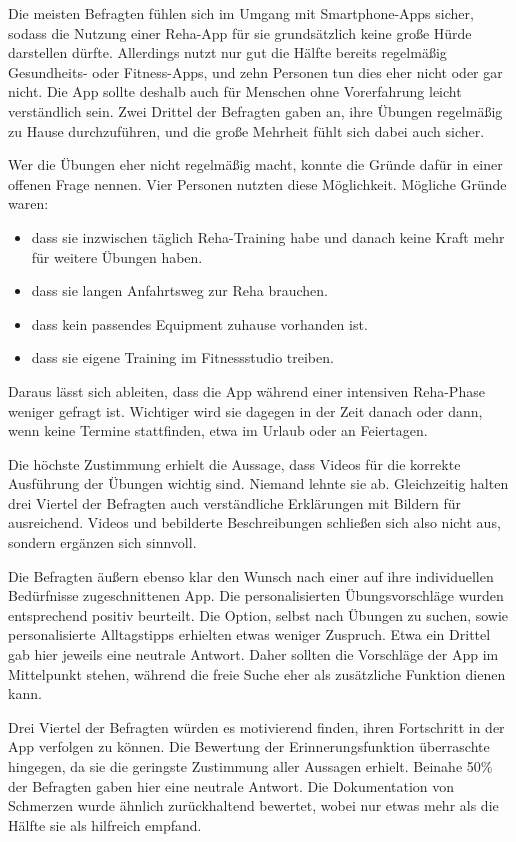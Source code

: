 Die meisten Befragten fühlen sich im Umgang mit Smartphone-Apps sicher, sodass
die Nutzung einer Reha-App für sie grundsätzlich keine große Hürde darstellen
dürfte. Allerdings nutzt nur gut die Hälfte bereits regelmäßig Gesundheits-
oder Fitness-Apps, und zehn Personen tun dies eher nicht oder gar nicht. Die
App sollte deshalb auch für Menschen ohne Vorerfahrung leicht verständlich
sein. Zwei Drittel der Befragten gaben an, ihre Übungen regelmäßig zu Hause
durchzuführen, und die große Mehrheit fühlt sich dabei auch sicher.

Wer die Übungen eher nicht regelmäßig macht, konnte die Gründe dafür in einer
offenen Frage nennen. Vier Personen nutzten diese Möglichkeit. Mögliche Gründe waren:
\begin{itemize}
    \item dass sie inzwischen täglich Reha-Training habe und danach keine Kraft
    mehr für weitere Übungen haben.
    \item dass sie langen Anfahrtsweg zur
    Reha brauchen.
    \item dass kein passendes Equipment zuhause vorhanden ist.
    \item dass sie eigene Training im Fitnessstudio treiben.
\end{itemize}
Daraus lässt sich ableiten, dass die App während einer intensiven Reha-Phase weniger
gefragt ist. Wichtiger wird sie dagegen in der Zeit danach oder dann, wenn
keine Termine stattfinden, etwa im Urlaub oder an Feiertagen.

Die höchste Zustimmung erhielt die Aussage, dass Videos für die korrekte
Ausführung der Übungen wichtig sind. Niemand lehnte sie ab. Gleichzeitig
halten drei Viertel der Befragten auch verständliche Erklärungen mit Bildern
für ausreichend. Videos und bebilderte Beschreibungen schließen sich also
nicht aus, sondern ergänzen sich sinnvoll.

Die Befragten äußern ebenso klar den Wunsch nach einer auf ihre individuellen Bedürfnisse zugeschnittenen App. Die personalisierten Übungsvorschläge wurden entsprechend positiv beurteilt. Die Option, selbst nach Übungen zu suchen, sowie personalisierte Alltagstipps erhielten etwas weniger Zuspruch. Etwa ein Drittel gab hier jeweils eine neutrale Antwort. Daher sollten die Vorschläge der App im Mittelpunkt stehen, während die freie Suche eher als zusätzliche Funktion dienen kann.

Drei Viertel der Befragten würden es motivierend finden, ihren Fortschritt in der App verfolgen zu können. Die Bewertung der Erinnerungsfunktion überraschte hingegen, da sie die geringste Zustimmung aller Aussagen erhielt. Beinahe 50\% der Befragten gaben hier eine neutrale Antwort. Die Dokumentation von Schmerzen wurde ähnlich zurückhaltend bewertet, wobei nur etwas mehr als die Hälfte sie als hilfreich empfand.


